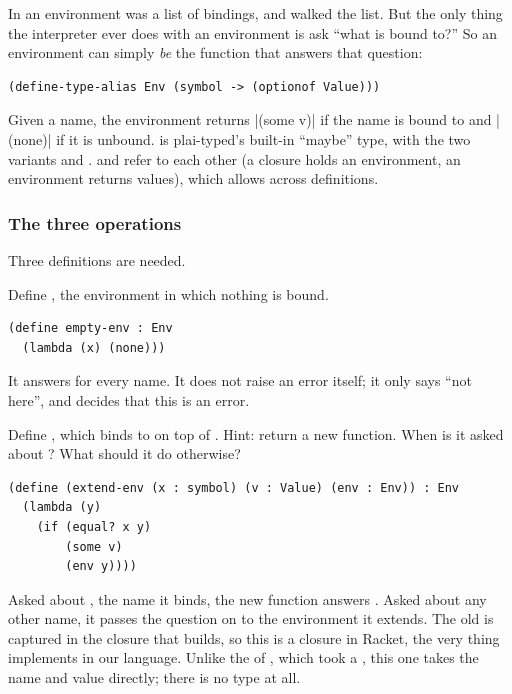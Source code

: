 In  an environment was a list of bindings, and  walked the list. But the only thing the interpreter ever does with an environment is ask ``what is  bound to?'' So an environment can simply \emph{be} the function that answers that question:
\begin{lstlisting}
(define-type-alias Env (symbol -> (optionof Value)))
\end{lstlisting}
Given a name, the environment returns \rkt|(some v)| if the name is bound to  and \rkt|(none)| if it is unbound.  is plai-typed's built-in ``maybe'' type, with the two variants  and .  and  refer to each other (a closure holds an environment, an environment returns values), which  allows across definitions.

\subsubsection{The three operations} Three definitions are needed.

\begin{exercise}
Define , the environment in which nothing is bound.
\end{exercise}
\begin{solution}
\begin{lstlisting}
(define empty-env : Env
  (lambda (x) (none)))
\end{lstlisting}
It answers  for every name. It does not raise an error itself; it only says ``not here'', and  decides that this is an error.
\end{solution}

\begin{exercise}
Define , which binds  to  on top of . Hint: return a new function. When is it asked about ? What should it do otherwise?
\end{exercise}
\begin{solution}
\begin{lstlisting}
(define (extend-env (x : symbol) (v : Value) (env : Env)) : Env
  (lambda (y)
    (if (equal? x y)
        (some v)
        (env y))))
\end{lstlisting}
Asked about , the name it binds, the new function answers . Asked about any other name, it passes the question on to the environment it extends. The old  is captured in the closure that  builds, so this is a closure in Racket, the very thing  implements in our language. Unlike the  of , which took a , this one takes the name and value directly; there is no  type at all.
\end{solution}

